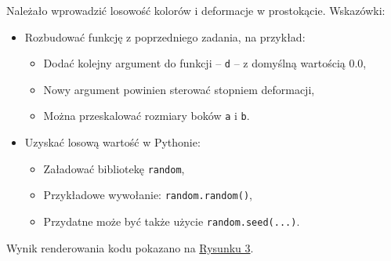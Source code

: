 \documentclass[a4paper, 12pt]{article}
\begin{document}
Należało wprowadzić losowość kolorów i deformacje w prostokącie. Wskazówki:
\begin{itemize}
    \item Rozbudować funkcję z poprzedniego zadania, na przykład:
    \begin{itemize}
        \item Dodać kolejny argument do funkcji -- \texttt{d} -- z domyślną wartością 0.0,
        \item Nowy argument powinien sterować stopniem deformacji,
        \item Można przeskalować rozmiary boków \texttt{a} i \texttt{b}.
    \end{itemize}
    \item Uzyskać losową wartość w Pythonie:
    \begin{itemize}
        \item Załadować bibliotekę \texttt{random},
        \item Przykładowe wywołanie: \texttt{random.random()},
        \item Przydatne może być także użycie \texttt{random.seed(...)}.
    \end{itemize}
\end{itemize}

Wynik renderowania kodu pokazano na \hyperref[fig:zad3]{Rysunku 3}.
\end{document}
